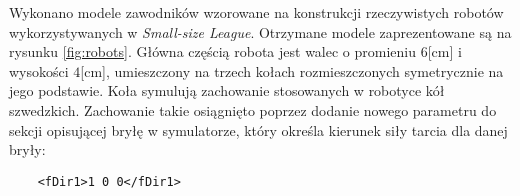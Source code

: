 	Wykonano modele zawodników wzorowane na konstrukcji rzeczywistych robotów wykorzystywanych w \emph{Small-size League}. Otrzymane modele zaprezentowane są na rysunku \ref{fig:robots}.
	Główna częścią robota jest walec o promieniu $6$[cm] i wysokości $4$[cm], umieszczony na trzech kołach rozmieszczonych symetrycznie na jego podstawie.
	Koła symulują zachowanie stosowanych w robotyce kół szwedzkich. Zachowanie takie osiągnięto poprzez dodanie nowego parametru do sekcji opisującej bryłę w symulatorze,
	który określa kierunek siły tarcia dla danej bryły:
	\begin{lstlisting}	
	<fDir1>1 0 0</fDir1>
	\end{lstlisting}
	
